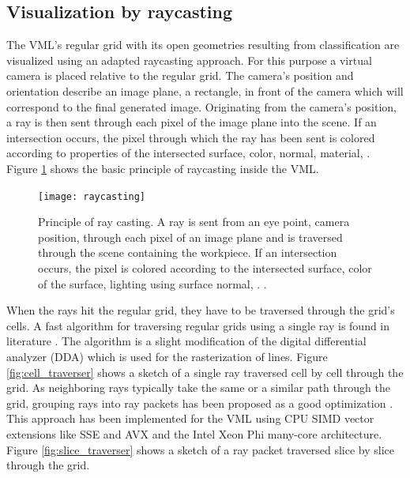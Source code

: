 \subsection{Visualization by raycasting}
\label{sec:raycasting}

The VML's regular grid with its open geometries resulting from classification are visualized using an adapted raycasting approach.
For this purpose a virtual camera is placed relative to the regular grid.
The camera's position and orientation describe an image plane, \ie a rectangle, in front of the camera which will correspond to the final generated image.
Originating from the camera's position, a ray is then sent through each pixel of the image plane into the scene.
If an intersection occurs, the pixel through which the ray has been sent is colored according to properties of the intersected surface, \eg color, normal, material, \etc.
Figure \ref{fig:raycasting_principle} shows the basic principle of raycasting inside the VML.

\begin{figure}
	\centering
	\texttt{[image: raycasting]}
	\caption{
		Principle of ray casting.
		A ray is sent from an eye point, \ie camera position, through each pixel of an image plane and is traversed through the scene containing the workpiece.
		If an intersection occurs, the pixel is colored according to the intersected surface, \protect\eg color of the surface, lighting using surface normal, \protect\etc.
		\cite{enlight_demo_workshop}.
	}
	\label{fig:raycasting_principle}
\end{figure}

When the rays hit the regular grid, they have to be traversed through the grid's cells.
A fast algorithm for traversing regular grids using a single ray is found in literature \cite{3DDDA}.
The algorithm is a slight modification of the digital differential analyzer (DDA) which is used for the rasterization of lines.
Figure \ref{fig:cell_traverser} shows a sketch of a single ray traversed cell by cell through the grid.
%
As neighboring rays typically take the same or a similar path through the grid, grouping rays into ray packets has been proposed as a good optimization \cite{packet_caster}.
This approach has been implemented for the VML using CPU SIMD vector extensions like SSE and AVX  \cite{enlight} and the Intel Xeon Phi many-core architecture.
Figure \ref{fig:slice_traverser} shows a sketch of a ray packet traversed slice by slice through the grid.


